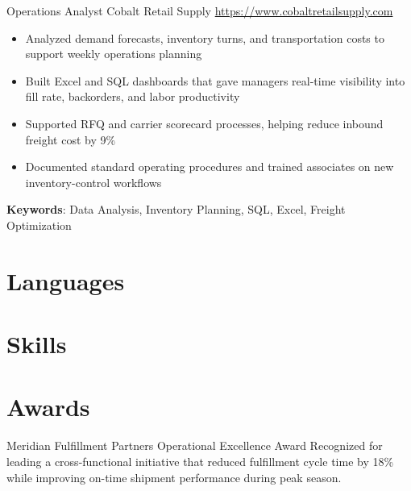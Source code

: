 \documentclass[a4paper, serif, 10pt]{moderncv}
\begin{document}
        {Operations Analyst}
        {Cobalt Retail Supply}
        {\url{https://www.cobaltretailsupply.com}}
        {}
        {\begin{itemize}
\item Analyzed demand forecasts, inventory turns, and transportation costs to support weekly operations planning
\item Built Excel and SQL dashboards that gave managers real-time visibility into fill rate, backorders, and labor productivity
\item Supported RFQ and carrier scorecard processes, helping reduce inbound freight cost by 9\%
\item Documented standard operating procedures and trained associates on new inventory-control workflows
\end{itemize}
\textbf{Keywords}: Data Analysis, Inventory Planning, SQL, Excel, Freight Optimization}
\section{Languages}

\section{Skills}

\section{Awards}

        {Meridian Fulfillment Partners}
        {Operational Excellence Award}
        {}
        {}
        {Recognized for leading a cross-functional initiative that reduced fulfillment cycle time by 18\% while improving on-time shipment performance during peak season.}
\end{document}
